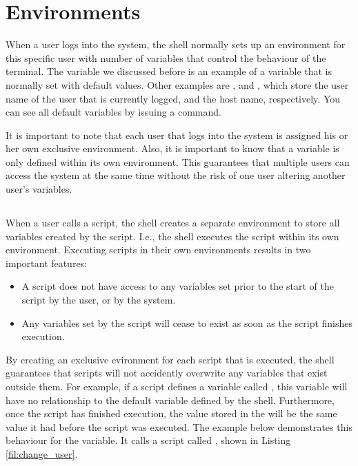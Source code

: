 \section{Environments}

When a user logs into the system, the shell normally sets up an environment for this specific user with number of variables that control the behaviour of the terminal. The  variable we discussed before is an example of a variable that is normally set with default values. Other examples are , and , which store the user name of the user that is currently logged, and the host name, respectively. You can see all default variables by issuing a  command.

It is important to note that each user that logs into the system is assigned his or her own exclusive environment. Also, it is important to know that a variable is only defined within its own environment. This guarantees that multiple users can access the system at the same time without the risk of one user altering another user's variables.


\subsection{}

When a user calls a script, the shell creates a separate environment to store all variables created by the script. I.e., the shell executes the script within its own environment. Executing scripts in their own environments results in two important features:
\begin{itemize}
\item A script does not have access to any variables set prior to the start of the script by the user, or by the system.
\item Any variables set by the script will cease to exist as soon as the script finishes execution.
\end{itemize}

By creating an exclusive evironment for each script that is executed, the shell guarantees that scripts will not accidently overwrite any variables that exist outside them. For example, if a script defines a variable called , this variable will have no relationship to the default  variable defined by the shell. Furthermore, once the script has finished execution, the value stored in the  will be the same value it had before the script was executed. The example below demonstrates this behaviour for the  variable. It calls a script called , shown in Listing \ref{fil:change_user}.

